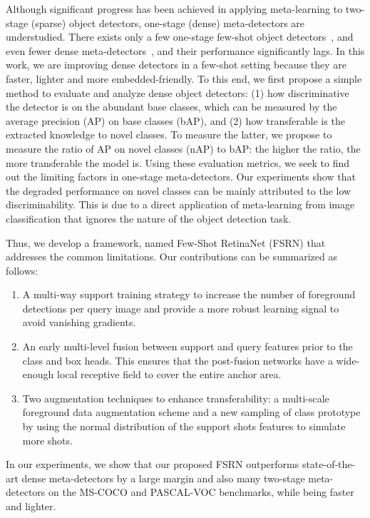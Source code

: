 \documentclass[10pt,twocolumn,letterpaper]{article}
\begin{document}
Although significant progress has been achieved in applying meta-learning to two-stage (sparse) object detectors, one-stage (dense) meta-detectors are understudied. 
There exists only a few one-stage few-shot object detectors~\cite{FSRW, once}, and even fewer dense meta-detectors~\cite{FSRW}, and their performance significantly lags. 
In this work, we are improving dense detectors in a few-shot setting because they are faster, lighter and more embedded-friendly. 
To this end, we first propose a simple method to evaluate and analyze dense object detectors: (1) how discriminative the detector is on the abundant base classes, which can be measured by the average precision (AP) on base classes (bAP), and (2) how transferable is the extracted knowledge to novel classes. To measure the latter, we propose to measure the ratio of AP on novel classes (nAP) to bAP: the higher the ratio, the more transferable the model is.
Using these evaluation metrics, we seek to find out the limiting factors in one-stage meta-detectors.
Our experiments show that the degraded performance on novel classes can be mainly attributed to the low discriminability. 
This is due to a direct application of meta-learning from image classification that ignores the nature of the object detection task. 

Thus, we develop a framework, named Few-Shot RetinaNet (FSRN) that addresses the common limitations.
Our contributions can be summarized as follows:
\begin{enumerate}[nolistsep]
    \item A multi-way support training strategy to increase the number of foreground detections per query image and provide a more robust learning signal to avoid vanishing gradients.
    \item An early multi-level fusion between support and query features prior to the class and box heads. This ensures that the post-fusion networks have a wide-enough local receptive field to cover the entire anchor area.
    \item Two augmentation techniques to enhance transferability: a multi-scale foreground data augmentation scheme and a new sampling of class prototype by using the normal distribution of the support shots features to simulate more shots.
\end{enumerate}
In our experiments, we show that our proposed FSRN outperforms state-of-the-art dense meta-detectors by a large margin and also many two-stage meta-detectors on the MS-COCO and PASCAL-VOC benchmarks, while being faster and lighter.
\end{document}
